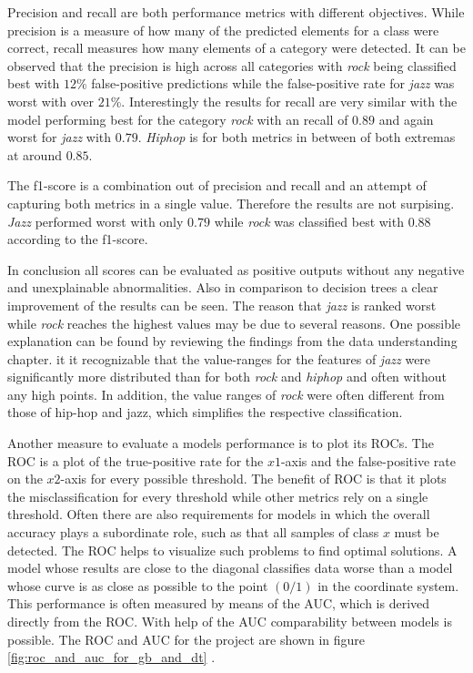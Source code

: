 Precision and recall are both performance metrics with different objectives. While precision is a measure of how many of the 
predicted elements for a class were correct, recall measures how many elements of a category were detected. It can be observed that 
the precision is high across all categories with \emph{rock} being classified best with \(12\)\% false-positive predictions while 
the false-positive rate for \emph{jazz} was worst with over \(21\)\%. Interestingly the results for recall are very similar with the model 
performing best for the category \emph{rock} with an recall of \(0.89\) and again worst for \emph{jazz} with \(0.79\). \emph{Hiphop} is for both metrics in 
between of both extremas at around \(0.85\). 

The f1-score is a combination out of precision and recall and an attempt of capturing both metrics in a single value. Therefore
the results are not surpising. \emph{Jazz} performed worst with only \(0.79\) while \emph{rock} was classified best with \(0.88\) according to the 
f1-score. 

In conclusion all scores can be evaluated as positive outputs without any negative and unexplainable abnormalities. Also in comparison 
to decision trees a clear improvement of the results can be seen. The reason that \emph{jazz} is ranked worst while \emph{rock} reaches the 
highest values may be due to several reasons. One possible explanation can be found by reviewing the findings from the data 
understanding chapter. it it recognizable that the value-ranges for the features of \emph{jazz} were significantly more distributed 
than for both \emph{rock} and \emph{hiphop} and often without any high points. In addition, the value ranges of \emph{rock} were often different from 
those of hip-hop and jazz, which simplifies the respective classification. 

Another measure to evaluate a models performance is to plot its \ac{ROC}s. The \ac{ROC} is a plot of the true-positive
rate for the \(x1\)-axis and the false-positive rate on the \(x2\)-axis for every possible threshold. The benefit of \ac{ROC} is that it plots the 
misclassification for every threshold while other metrics rely on a single threshold. Often there are also requirements for 
models in which the overall accuracy plays a subordinate role, such as that all samples of class \(x\) must be detected. The \ac{ROC} helps 
to visualize such problems to find optimal solutions. A model whose results are close to the diagonal classifies data worse than a 
model whose curve is as close as possible to the point \((0/1)\) in the coordinate system. This performance is often measured by means of 
the \ac{AUC}, which is derived directly from the \ac{ROC}. With help of the \ac{AUC} comparability between models is possible. The \ac{ROC} and \ac{AUC} for 
the project are shown in figure \ref{fig:roc_and_auc_for_gb_and_dt} \cite[p.862f]{fawcett2006introduction} \cite{scikit-roc_and_auc}. 

